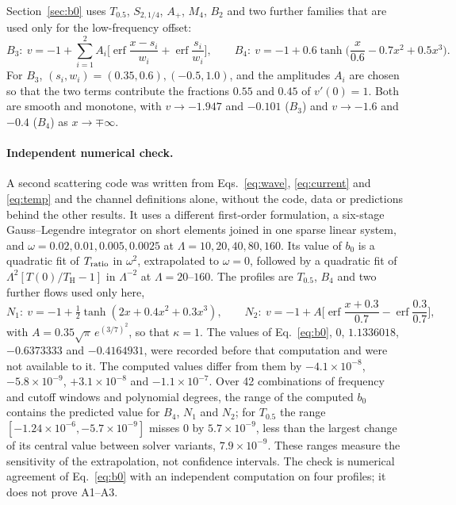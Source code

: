 \documentclass[10pt,a4paper]{article}
\newcommand{\HawkingT}{T_{\mathrm H}}
\begin{document}
Section~\ref{sec:b0} uses $T_{0.5}$, $S_{2,1/4}$, $A_+$, $M_4$, $B_2$ and
two further families that are used only for the low-frequency offset:
\begin{equation}
 B_3:\ v=-1+\sum_{i=1}^{2}A_i\Big[\operatorname{erf}\frac{x-s_i}{w_i}
 +\operatorname{erf}\frac{s_i}{w_i}\Big],\qquad
 B_4:\ v=-1+0.6\tanh\!\Big(\frac{x}{0.6}-0.7x^2+0.5x^3\Big).
 \label{eq:newprofiles}
\end{equation}
For $B_3$, $(s_i,w_i)=(0.35,0.6),(-0.5,1.0)$, and the amplitudes $A_i$ are
chosen so that the two terms contribute the fractions $0.55$ and $0.45$ of
$v'(0)=1$. Both are smooth and monotone, with $v\to-1.947$ and $-0.101$
($B_3$) and $v\to-1.6$ and $-0.4$ ($B_4$) as $x\to\mp\infty$.

\paragraph{Independent numerical check.}
A second scattering code was written from Eqs.~\eqref{eq:wave},
\eqref{eq:current} and \eqref{eq:temp} and the channel definitions alone,
without the code, data or predictions behind the other results. It uses a
different first-order formulation, a six-stage Gauss--Legendre
integrator on short elements joined in one sparse linear system, and
$\omega=0.02,0.01,0.005,0.0025$ at $\Lambda=10,20,40,80,160$. Its value of $b_0$ is a quadratic fit of
$T_{\rm ratio}$ in $\omega^2$, extrapolated to $\omega=0$, followed by a
quadratic fit of $\Lambda^2[T(0)/\HawkingT-1]$ in $\Lambda^{-2}$ at
$\Lambda=20$--$160$. The profiles are $T_{0.5}$, $B_4$ and two further
flows used only here,
\begin{equation}
 N_1:\ v=-1+\tfrac12\tanh(2x+0.4x^2+0.3x^3),\qquad
 N_2:\ v=-1+A\Big[\operatorname{erf}\frac{x+0.3}{0.7}
 -\operatorname{erf}\frac{0.3}{0.7}\Big],
 \label{eq:indepprofiles}
\end{equation}
with $A=0.35\sqrt\pi\,e^{(3/7)^2}$, so that $\kappa=1$. The
values of Eq.~\eqref{eq:b0}, $0$, $1.1336018$, $-0.6373333$ and
$-0.4164931$, were recorded before that computation and were not
available to it. The computed values differ from them by
$-4.1\times10^{-8}$, $-5.8\times10^{-9}$, $+3.1\times10^{-8}$ and
$-1.1\times10^{-7}$. Over 42 combinations of frequency and cutoff
windows and polynomial degrees, the range of the computed $b_0$ contains
the predicted value for $B_4$, $N_1$ and $N_2$; for $T_{0.5}$ the range
$[-1.24\times10^{-6},-5.7\times10^{-9}]$ misses $0$ by
$5.7\times10^{-9}$, less than the largest change of its central value
between solver variants, $7.9\times10^{-9}$. These ranges measure the
sensitivity of the extrapolation, not confidence intervals. The check is
numerical agreement of Eq.~\eqref{eq:b0} with an independent
computation on four profiles; it does not prove A1--A3.
\end{document}
